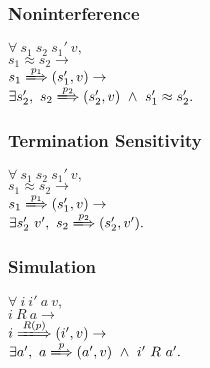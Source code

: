 \subsubsection*{Noninterference}

$\forall\ s_1\ s_2\ s_1'\ v,$\\[2pt]
$s_1\approx s_2 \rightarrow$\\[2pt]
$s_1 \xLongrightarrow{p_1} (s_1', v) \rightarrow$\\[2pt]
$\exists s_2',\ s_2 \xLongrightarrow{p_2} (s_2', v)\ \wedge\ s_1'\approx s_2'.$

\subsubsection*{Termination Sensitivity}

$\forall\ s_1\ s_2\ s_1'\ v,$\\[2pt]
$s_1\approx s_2 \rightarrow$\\[2pt]
$s_1 \xLongrightarrow{p_1} (s_1', v) \rightarrow$\\[2pt]
$\exists s_2'\ v',\ s_2 \xLongrightarrow{p_2} (s_2', v').$

\subsubsection*{Simulation}

$\forall\ i\ i'\ a\ v,$\\[2pt]
$i\ R\ a \rightarrow$\\[2pt]
$i \xLongrightarrow{R(p)} (i', v) \rightarrow$\\[2pt]
$\exists a',\ a \xLongrightarrow{p} (a', v)\ \wedge\ i'\ R\ a'.$

